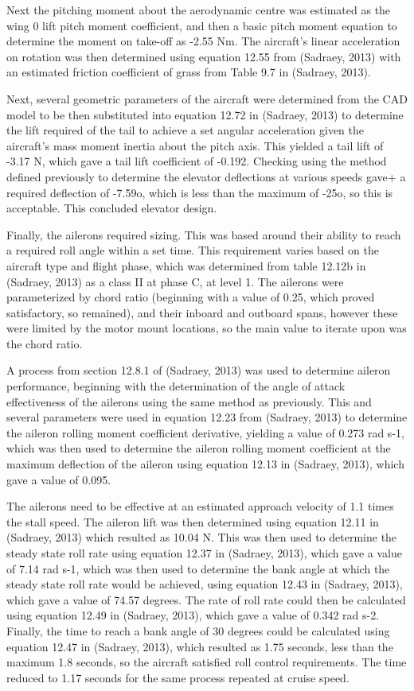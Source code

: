 \documentclass[../../main.tex]{subfiles}
\begin{document}
Next the pitching moment about the aerodynamic centre was estimated as the wing 0 lift pitch moment coefficient, and then a basic pitch moment equation to determine the moment on take-off as -2.55 Nm.
The aircraft’s linear acceleration on rotation was then determined using equation 12.55 from (Sadraey, 2013) with an estimated friction coefficient of grass from Table 9.7 in (Sadraey, 2013). 

Next, several geometric parameters of the aircraft were determined from the CAD model to be then substituted into equation 12.72 in (Sadraey, 2013) to determine the lift required of the tail to achieve a set angular acceleration given the aircraft’s mass moment inertia about the pitch axis.
This yielded a tail lift of -3.17 N, which gave a tail lift coefficient of -0.192.
Checking using the method defined previously to determine the elevator deflections at various speeds gave+ a required deflection of -7.59o, which is less than the maximum of -25o, so this is acceptable.
This concluded elevator design. 

Finally, the ailerons required sizing.
This was based around their ability to reach a required roll angle within a set time.
This requirement varies based on the aircraft type and flight phase, which was determined from table 12.12b in (Sadraey, 2013) as a class II at phase C, at level 1.
The ailerons were parameterized by chord ratio (beginning with a value of 0.25, which proved satisfactory, so remained), and their inboard and outboard spans, however these were limited by the motor mount locations, so the main value to iterate upon was the chord ratio.  

A process from section 12.8.1 of (Sadraey, 2013) was used to determine aileron performance, beginning with the determination of the angle of attack effectiveness of the ailerons using the same method as previously.
This and several parameters were used in equation 12.23 from (Sadraey, 2013) to determine the aileron rolling moment coefficient derivative, yielding a value of 0.273 rad s-1, which was then used to determine the aileron rolling moment coefficient at the maximum deflection of the aileron using equation 12.13 in (Sadraey, 2013), which gave a value of 0.095. 

The ailerons need to be effective at an estimated approach velocity of 1.1 times the stall speed.
The aileron lift was then determined using equation 12.11 in (Sadraey, 2013) which resulted as 10.04 N.
This was then used to determine the steady state roll rate using equation 12.37 in (Sadraey, 2013), which gave a value of 7.14 rad s-1, which was then used to determine the bank angle at which the steady state roll rate would be achieved, using equation 12.43 in (Sadraey, 2013), which gave a value of 74.57 degrees.
The rate of roll rate could then be calculated using equation 12.49 in (Sadraey, 2013), which gave a value of 0.342 rad s-2.
Finally, the time to reach a bank angle of 30 degrees could be calculated using equation 12.47 in (Sadraey, 2013), which resulted as 1.75 seconds, less than the maximum 1.8 seconds, so the aircraft satisfied roll control requirements.
The time reduced to 1.17 seconds for the same process repeated at cruise speed. 
\end{document}
